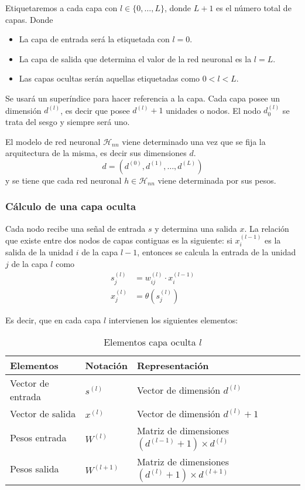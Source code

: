 Etiquetaremos a cada capa con $l \in \{0, \ldots, L \}$, donde $L+1$ es el número total de capas.  Donde 

\begin{itemize}
    \item La capa de entrada será la etiquetada con $l = 0$.
    \item La capa de salida que determina el valor de la red neuronal es la $l=L$.
    \item Las capas ocultas serán aquellas etiquetadas como $0 < l <L.$
\end{itemize}

Se usará un superíndice para hacer referencia a la capa. 
Cada capa posee un dimensión $d^{(l)}$, es decir que posee
$d^{(l)} + 1$ unidades o nodos. El nodo $d_0^{(l)}$ se trata del sesgo y siempre será uno. 

El modelo de red neuronal $\mathcal{H}_{n n}$ viene determinado una vez que se fija la arquitectura de la misma, es decir sus dimensiones $d$. 
\begin{equation}
    d = (d^{(0)}, d^{(1)}, \ldots, d^{(L)})
\end{equation}
y se tiene que cada red neuronal $h \in \mathcal{H}_{n n}$
viene determinada por sus pesos. 

\subsubsection*{Cálculo de una capa oculta}  
Cada nodo recibe una señal de entrada $s$ y determina una salida $x$. 
La relación que existe entre dos nodos de capas contiguas es la siguiente: si $x_i^{(l-1)}$ es la salida de la unidad $i$ de la capa $l-1$, 
entonces se calcula la entrada de la unidad $j$ de la capa $l$ como 
\begin{align}\label{eq:construccion_red_neuronas:calculo_una_capa_oculta}
    s_j^{(l)} &= w_{i j}^{(l)} \cdot x_i^{(l-1)}  \\
    x_j^{(l)} &= \theta(s_j^{(l)})
\end{align}

Es decir, que en cada capa $l$ intervienen los siguientes elementos:  
\begin{table}[h]
    \begin{center}
    \begin{tabular}{| l | l | l |}
    \hline
    Elementos & Notación & Representación 
    \\ \hline
    Vector de entrada & $s^{(l)}$ &  Vector de dimensión $d^{(l)}$ \\
    Vector de salida & $x^{(l)}$ &  Vector de dimensión $d^{(l)}+ 1$ \\
    Pesos entrada & $W^{(l)}$ & Matriz de dimensiones $(d^{(l-1)}+1) \times d^{(l)}$ \\
    Pesos salida & $W^{(l+1)}$ 
    & Matriz de dimensiones $(d^{(l)}+1) \times d^{(l+1)}$ \\
    \hline
    \end{tabular}
    \caption{Elementos capa oculta $l$}
    \label{tab:rrnn_elementos_capa_oculta}
    \end{center}
\end{table}

